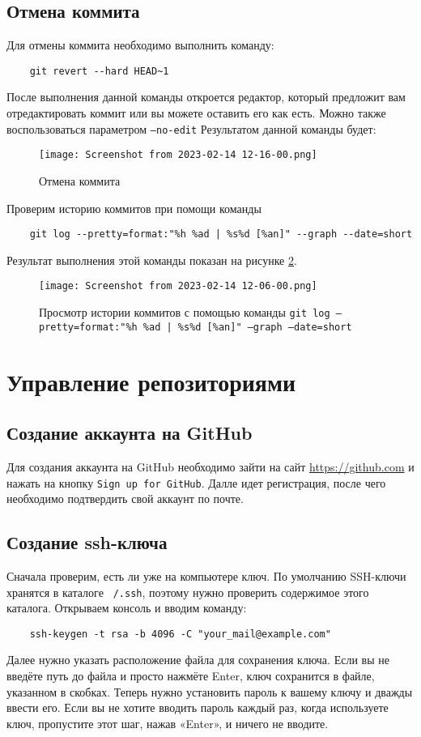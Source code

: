 \subsection{Отмена коммита}
Для отмены коммита необходимо выполнить команду:
\begin{verbatim}
	git revert --hard HEAD~1
\end{verbatim}
После выполнения данной команды откроется редактор, который предложит вам
отредактировать коммит или вы можете оставить его как есть. Можно также
воспользоваться параметром \texttt{--no-edit}
Результатом данной команды будет:
\begin{figure}[hp]
	\centering
	\texttt{[image: Screenshot from 2023-02-14 12-16-00.png]}
	\caption{Отмена коммита}
	\label{fig:git:revert:--hard:HEAD~1}
\end{figure}
Проверим историю коммитов при помощи команды
\begin{verbatim}
	git log --pretty=format:"%h %ad | %s%d [%an]" --graph --date=short
\end{verbatim}
Результат выполнения этой команды показан на рисунке \ref{fig:git:log:pretty:format}.
\begin{figure}[hp]
	\centering
	\texttt{[image: Screenshot from 2023-02-14 12-06-00.png]}
	\caption{Просмотр истории коммитов с помощью команды \texttt{git log --pretty=format:"\%h \%ad | \%s\%d [\%an]" --graph --date=short}}
	\label{fig:git:log:pretty:format}
\end{figure}

\section{Управление репозиториями}
\subsection{Создание аккаунта на GitHub}
Для создания аккаунта на GitHub необходимо зайти на сайт \url{https://github.com} и нажать на кнопку
\texttt{Sign up for GitHub}. Далле идет регистрация, после чего необходимо подтвердить свой аккаунт по почте.

\subsection{Создание ssh-ключа}
Сначала проверим, есть ли уже на компьютере ключ. По умолчанию SSH-ключи
хранятся в каталоге \texttt{~/.ssh}, поэтому нужно проверить содержимое этого каталога.
Открываем консоль и вводим команду:
\begin{verbatim}
	ssh-keygen -t rsa -b 4096 -C "your_mail@example.com"
\end{verbatim}
Далее нужно указать расположение файла для сохранения ключа. Если вы не
введёте путь до файла и просто нажмёте Enter, ключ сохранится в файле,
указанном в скобках.
Теперь нужно установить пароль к вашему ключу и дважды ввести его. Если вы не
хотите вводить пароль каждый раз, когда используете ключ, пропустите этот шаг,
нажав «Enter», и ничего не вводите.
